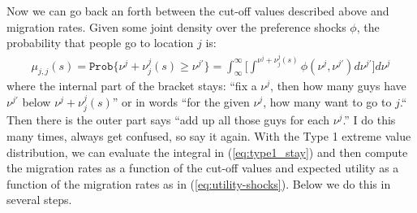 \documentclass[pdftex,11pt]{article}
\begin{document}
Now we can go back an forth between the cut-off values described above and migration rates. Given some joint density over the preference shocks $\phi$, the probability that people go to location $j$ is:
\begin{align}
\mu_{j,j}(s)  = \mathtt{Prob}\{ \nu^{j} + \nu_j^{j}(s) \geq \nu^{j'} \} = \int_{\infty}^{\infty} \bigg [ \int^{\nu^{j} + \nu_j^{j}(s)} \phi(\nu^{j},\nu^{j'})d\nu^{j'} \bigg ] d\nu^{j}
\label{eq:type1_stay}
\end{align}
where the internal part of the bracket stays: ``fix a $\nu^j$, then how many guys have $\nu^{j'}$ below $\nu^j + \nu_j^{j}(s)$'' or in words ``for the given $\nu^j$, how many want to go to $j$.`` Then there is the outer part says ``add up all those guys for each $\nu^{j}$.'' I do this many times, always get confused, so say it again. With the Type 1 extreme value distribution, we can evaluate the integral in (\ref{eq:type1_stay}) and then compute the migration rates as a function of the cut-off values and expected utility as a function of the migration rates as in (\ref{eq:utility-shocks}).
Below we do this in several steps.
\end{document}
